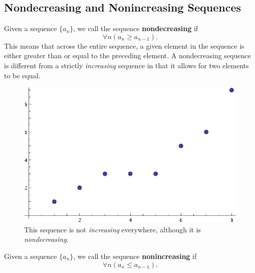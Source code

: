 \subsection{Nondecreasing and Nonincreasing Sequences}\label{nondecreasing}
\begin{defn}
  Given a sequence \(\{a_n\}\), we call the sequence \textbf{nondecreasing} if
  \[\forall n (a_n \geq a_{n-1}).\]
  This means that across the entire sequence, a given element in the sequence is either greater than or equal to the preceding element.
  A nondecreasing sequence is different from a strictly \emph{increasing} sequence in that it allows for two elements to be equal.
  \begin{figure}[H]
    \begin{center}
      \includegraphics[scale=0.5]{continuous/sequence/nondecreasing}
    \end{center}
    \caption{This sequence is not \emph{increasing} everywhere, although it is \emph{nondecreasing}.}
  \end{figure}
\end{defn}
\begin{defn}
  Given a sequence \(\{a_n\}\), we call the sequence \textbf{nonincreasing} if
  \[\forall n (a_n \leq a_{n-1}).\]
\end{defn}
